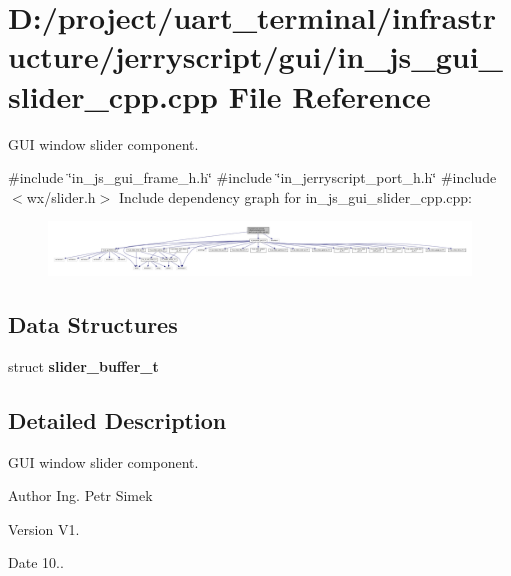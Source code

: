 \section{D\+:/project/uart\+\_\+terminal/infrastructure/jerryscript/gui/in\+\_\+js\+\_\+gui\+\_\+slider\+\_\+cpp.cpp File Reference}
\label{in__js__gui__slider__cpp_8cpp}


G\+UI window slider component.  


{\ttfamily \#include \char`\"{}in\+\_\+js\+\_\+gui\+\_\+frame\+\_\+h.\+h\char`\"{}}\newline
{\ttfamily \#include \char`\"{}in\+\_\+jerryscript\+\_\+port\+\_\+h.\+h\char`\"{}}\newline
{\ttfamily \#include $<$wx/slider.\+h$>$}\newline
Include dependency graph for in\+\_\+js\+\_\+gui\+\_\+slider\+\_\+cpp.\+cpp\+:
\nopagebreak
\begin{figure}[H]
\begin{center}
\leavevmode
\includegraphics[width=350pt]{in__js__gui__slider__cpp_8cpp__incl}
\end{center}
\end{figure}
\subsection*{Data Structures}
\begin{DoxyCompactItemize}
\item 
struct \textbf{ slider\+\_\+buffer\+\_\+t}
\end{DoxyCompactItemize}


\subsection{Detailed Description}
G\+UI window slider component. 

\begin{DoxyAuthor}{Author}
Ing. Petr Simek 
\end{DoxyAuthor}
\begin{DoxyVersion}{Version}
V1. 
\end{DoxyVersion}
\begin{DoxyDate}{Date}
10.. 
\end{DoxyDate}
